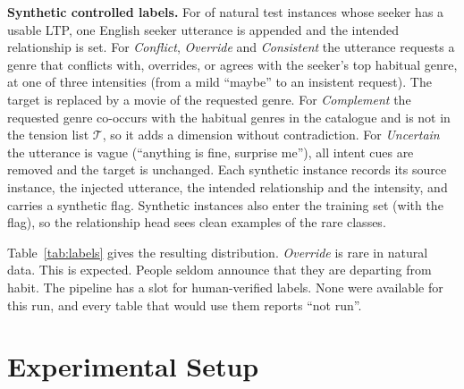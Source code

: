 \textbf{Synthetic controlled labels.} For \injRate{} of natural test instances whose seeker has a usable LTP, one English seeker utterance is appended and the intended relationship is set. For \emph{Conflict}, \emph{Override} and \emph{Consistent} the utterance requests a genre that conflicts with, overrides, or agrees with the seeker's top habitual genre, at one of three intensities (from a mild ``maybe'' to an insistent request). The target is replaced by a movie of the requested genre. For \emph{Complement} the requested genre co-occurs with the habitual genres in the catalogue and is not in the tension list $\mathcal{T}$, so it adds a dimension without contradiction. For \emph{Uncertain} the utterance is vague (``anything is fine, surprise me''), all intent cues are removed and the target is unchanged. Each synthetic instance records its source instance, the injected utterance, the intended relationship and the intensity, and carries a synthetic flag. Synthetic instances also enter the training set (with the flag), so the relationship head sees clean examples of the rare classes.

Table~\ref{tab:labels} gives the resulting distribution. \emph{Override} is rare in natural data. This is expected. People seldom announce that they are departing from habit. The pipeline has a slot for human-verified labels. None were available for this run, and every table that would use them reports ``not run''.

\begin{table}[t]
  \centering
  \caption{Relationship label counts by source and split.}
  \label{tab:labels}
  \small
  
\end{table}

\section{Experimental Setup}
\label{sec:setup}
